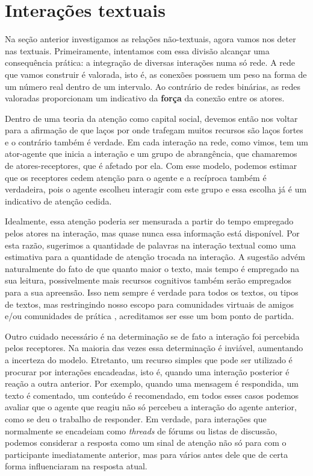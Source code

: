 \section{Interações textuais}

Na seção anterior investigamos as relações não-textuais, agora vamos nos deter
nas textuais. Primeiramente, intentamos com essa divisão alcançar uma
consequência prática: a integração de diversas interações numa só rede. A rede
que vamos construir é valorada, isto é, as conexões possuem um peso na forma de
um número real dentro de um intervalo. Ao contrário de redes binárias, as redes
valoradas proporcionam um indicativo da \textbf{força} da conexão entre os
atores.

Dentro de uma teoria da atenção como capital social, devemos então nos voltar
para a afirmação de que laços por onde trafegam muitos recursos são laços fortes
e o contrário também é verdade. Em cada interação na rede, como vimos, tem um
ator-agente que inicia a interação e um grupo de abrangência, que chamaremos de
atores-receptores, que é afetado por ela. Com esse modelo, podemos estimar que
os receptores cedem atenção para o agente e a recíproca também é verdadeira,
pois o agente escolheu interagir com este grupo e essa escolha já é um
indicativo de atenção cedida.

Idealmente, essa atenção poderia ser mensurada a partir do tempo empregado pelos
atores na interação, mas quase nunca essa informação está disponível. Por esta
razão, sugerimos a quantidade de palavras na interação textual como uma
estimativa para a quantidade de atenção trocada na interação. A sugestão advém
naturalmente do fato de que quanto maior o texto, mais tempo é empregado na sua
leitura, possivelmente mais recursos cognitivos também serão empregados para a
sua apreensão. Isso nem sempre é verdade para todos os textos, ou tipos de
textos, mas restringindo nosso escopo para comunidades virtuais de amigos e/ou
comunidades de prática \citep{Lave1991, Lave1991a}, acreditamos ser esse
um bom ponto de partida.

Outro cuidado necessário é na determinação se de fato a interação foi percebida
pelos receptores. Na maioria das vezes essa determinação é inviável, aumentando
a incerteza do modelo. Etretanto, um recurso simples que pode ser utilizado é
procurar por interações encadeadas, isto é, quando uma interação posterior é 
reação a outra anterior. Por exemplo, quando uma mensagem é respondida, um texto
é comentado, um conteúdo é recomendado, em todos esses casos podemos avaliar que
o agente que reagiu não só percebeu a interação do agente anterior, como se deu
o trabalho de responder. Em verdade, para interações que normalmente se
encadeiam como \emph{threads} de fórums ou listas de discussão, podemos
considerar a resposta como um sinal de atenção não só para com o participante
imediatamente anterior, mas para vários antes dele que de certa forma
influenciaram na resposta atual.

